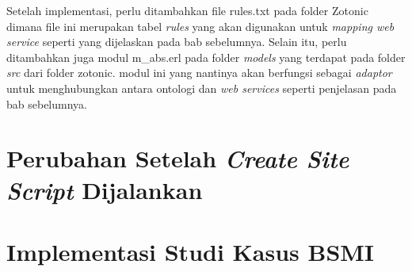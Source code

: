 	Setelah implementasi, perlu ditambahkan file rules.txt pada folder Zotonic dimana file ini merupakan tabel \textit{rules} yang akan digunakan untuk \textit{mapping web service} seperti yang dijelaskan pada bab sebelumnya. Selain itu, perlu ditambahkan juga modul m\_abs.erl pada folder \textit{models} yang terdapat pada folder \textit{src} dari folder zotonic. modul ini yang nantinya akan berfungsi sebagai \textit{adaptor} untuk menghubungkan antara ontologi dan \textit{web services} seperti penjelasan pada bab sebelumnya.
		
\section{Perubahan Setelah \textit{Create Site Script} Dijalankan}

\section{Implementasi Studi Kasus BSMI}
